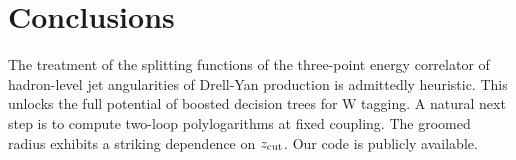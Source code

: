 \section{Conclusions}\label{sec:conclusions}

The treatment of the splitting functions of the three-point energy
correlator of hadron-level jet angularities of Drell-Yan production is
admittedly heuristic. This unlocks the full potential of boosted
decision trees for W tagging. A natural next step is to compute two-loop
polylogarithms at fixed coupling. The groomed radius exhibits a striking
dependence on $z_{\rm cut}$. Our code is publicly available.

